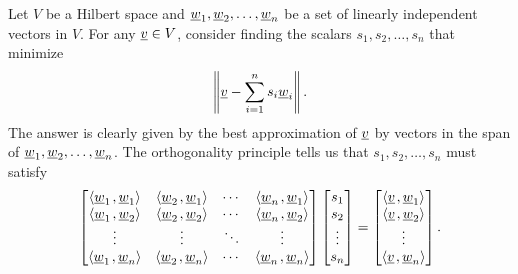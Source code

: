 Let $V$ be a Hilbert space and $\underline{w}_1 ,\underline{w}_2 , \ldots, \underline{w}_n$ be a set of linearly independent vectors in $V$.
For any $\underline{v} \in V$, consider finding the scalars $s_1,s_2,\ldots,s_n$ that minimize
\[ \left\| \underline{v} - \sum_{i=1}^n s_i \underline{w}_i \right\|. \]
The answer is clearly given by the best approximation of $\underline{v}$ by vectors in the span of $\underline{w}_1 ,\underline{w}_2 , \ldots, \underline{w}_n$.
The orthogonality principle tells us that $s_1,s_2,\ldots,s_n$ must satisfy
\begin{equation} \label{eqn:DualNormalEquations}
\begin{bmatrix}
{\left\langle  \underline{w}_1  \mskip2mu ,  \underline{w}_1  \right\rangle}
& {\left\langle  \underline{w}_2  \mskip2mu ,  \underline{w}_1  \right\rangle} & \cdots
& {\left\langle  \underline{w}_n  \mskip2mu ,  \underline{w}_1  \right\rangle} \\
{\left\langle  \underline{w}_1  \mskip2mu ,  \underline{w}_2  \right\rangle}
& {\left\langle  \underline{w}_2  \mskip2mu ,  \underline{w}_2  \right\rangle} & \cdots
& {\left\langle  \underline{w}_n  \mskip2mu ,  \underline{w}_2  \right\rangle} \\
\vdots & \vdots & \ddots & \vdots \\
{\left\langle  \underline{w}_1  \mskip2mu ,  \underline{w}_n  \right\rangle}
& {\left\langle  \underline{w}_2  \mskip2mu ,  \underline{w}_n  \right\rangle} & \cdots
& {\left\langle  \underline{w}_n  \mskip2mu ,  \underline{w}_n  \right\rangle}
\end{bmatrix}
\begin{bmatrix} s_1 \\ s_2 \\ \vdots \\ s_n \end{bmatrix}
= \begin{bmatrix}
{\left\langle  \underline{v}  \mskip2mu ,  \underline{w}_1  \right\rangle} \\
{\left\langle  \underline{v}  \mskip2mu ,  \underline{w}_2  \right\rangle} \\ \vdots \\
{\left\langle  \underline{v}  \mskip2mu ,  \underline{w}_n  \right\rangle} \end{bmatrix} .
\end{equation}

